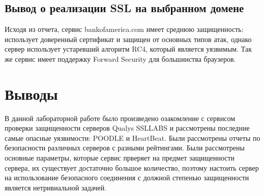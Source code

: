 \documentclass[10pt,a4paper]{report}
\begin{document}
		\subsection{Вывод о реализации SSL на выбранном домене}
			Исходя из отчета, сервис bankofamerica.com имеет среднюю защищенность:
			использует доверенный сертификат и защищен от основных типов атак, однако сервер использует устаревший алгоритм RC4, который является 
уязвимым. Так же сервис имеет поддержку Forward Security для большинства браузеров.
		
	\section{Выводы}

		В данной лабораторной работе было произведено озакомление с сервисом проверки защищенности серверов Qualys SSLLABS и рассмотрены последние самые опасные уязвимости: POODLE и HeartBeat.
		Были рассмотрены отчеты по безопасности различных серверов с разными рейтингами.
		Были рассмотрены основные параметры, которые сервис прверяет на предмет защищенности сервера, их существует достаточно большое количество, поэтому настоить сервер на использование безопасного соединения с должной степенью защищенности является нетривиальной задачей.
	
\end{document}
